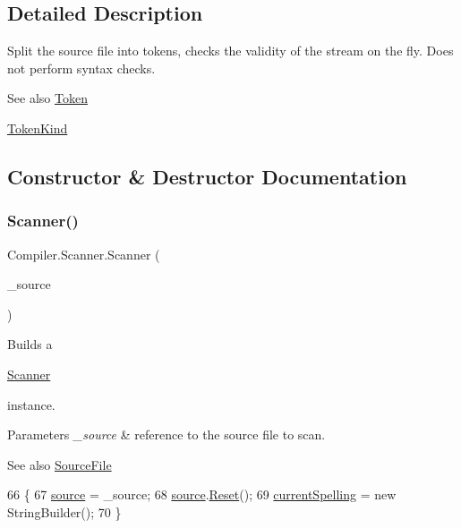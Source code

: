 \subsection{Detailed Description}
Split the source file into tokens, checks the validity of the stream on the fly. Does not perform syntax checks. \begin{DoxySeeAlso}{See also}
\mbox{\hyperlink{class_compiler_1_1_token}{Token}} 

\mbox{\hyperlink{namespace_compiler_a57929962f25004759596fc3f13cf563c}{Token\+Kind}} 
\end{DoxySeeAlso}


\subsection{Constructor \& Destructor Documentation}
\mbox{\label{class_compiler_1_1_scanner_a1b80cbd150fb8fdb87f6b31c9d2ddc48}} 
\subsubsection{\texorpdfstring{Scanner()}{Scanner()}}
{\footnotesize\ttfamily Compiler.\+Scanner.\+Scanner (\begin{DoxyParamCaption}\item[{\mbox{\hyperlink{class_compiler_1_1_source_file}{Source\+File}}}]{\+\_\+source }\end{DoxyParamCaption})}

Builds a
\begin{DoxyCode}
\mbox{\hyperlink{class_compiler_1_1_scanner_a1b80cbd150fb8fdb87f6b31c9d2ddc48}{Scanner}} 
\end{DoxyCode}
 instance. 
\begin{DoxyParams}{Parameters}
{\em \+\_\+source} & reference to the source file to scan. \\
\hline
\end{DoxyParams}
\begin{DoxySeeAlso}{See also}
\mbox{\hyperlink{class_compiler_1_1_source_file}{Source\+File}} 
\end{DoxySeeAlso}

\begin{DoxyCode}
66                                                        \{
67                         \mbox{\hyperlink{class_compiler_1_1_scanner_a6fa17eef62c3cf43853464ccfbd61966}{source}} = \_source;
68                         \mbox{\hyperlink{class_compiler_1_1_scanner_a6fa17eef62c3cf43853464ccfbd61966}{source}}.\mbox{\hyperlink{class_compiler_1_1_source_file_aa64348e54dbb048b3ec58ce3d355e014}{Reset}}();
69                         \mbox{\hyperlink{class_compiler_1_1_scanner_a3bea5b7c795b6ecfff02cf15f197e277}{currentSpelling}} = \textcolor{keyword}{new} StringBuilder();
70                     \}
\end{DoxyCode}


